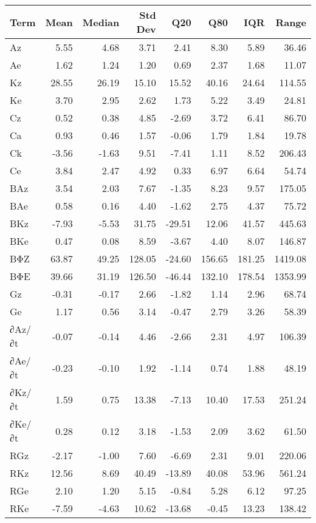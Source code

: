 \begin{tabular}{lrrrrrrr}
\toprule
Term & Mean & Median & Std Dev & Q20 & Q80 & IQR & Range \\
\midrule
Az & 5.55 & 4.68 & 3.71 & 2.41 & 8.30 & 5.89 & 36.46 \\
Ae & 1.62 & 1.24 & 1.20 & 0.69 & 2.37 & 1.68 & 11.07 \\
Kz & 28.55 & 26.19 & 15.10 & 15.52 & 40.16 & 24.64 & 114.55 \\
Ke & 3.70 & 2.95 & 2.62 & 1.73 & 5.22 & 3.49 & 24.81 \\
Cz & 0.52 & 0.38 & 4.85 & -2.69 & 3.72 & 6.41 & 86.70 \\
Ca & 0.93 & 0.46 & 1.57 & -0.06 & 1.79 & 1.84 & 19.78 \\
Ck & -3.56 & -1.63 & 9.51 & -7.41 & 1.11 & 8.52 & 206.43 \\
Ce & 3.84 & 2.47 & 4.92 & 0.33 & 6.97 & 6.64 & 54.74 \\
BAz & 3.54 & 2.03 & 7.67 & -1.35 & 8.23 & 9.57 & 175.05 \\
BAe & 0.58 & 0.16 & 4.40 & -1.62 & 2.75 & 4.37 & 75.72 \\
BKz & -7.93 & -5.53 & 31.75 & -29.51 & 12.06 & 41.57 & 445.63 \\
BKe & 0.47 & 0.08 & 8.59 & -3.67 & 4.40 & 8.07 & 146.87 \\
BΦZ & 63.87 & 49.25 & 128.05 & -24.60 & 156.65 & 181.25 & 1419.08 \\
BΦE & 39.66 & 31.19 & 126.50 & -46.44 & 132.10 & 178.54 & 1353.99 \\
Gz & -0.31 & -0.17 & 2.66 & -1.82 & 1.14 & 2.96 & 68.74 \\
Ge & 1.17 & 0.56 & 3.14 & -0.47 & 2.79 & 3.26 & 58.39 \\
∂Az/∂t & -0.07 & -0.14 & 4.46 & -2.66 & 2.31 & 4.97 & 106.39 \\
∂Ae/∂t & -0.23 & -0.10 & 1.92 & -1.14 & 0.74 & 1.88 & 48.19 \\
∂Kz/∂t & 1.59 & 0.75 & 13.38 & -7.13 & 10.40 & 17.53 & 251.24 \\
∂Ke/∂t & 0.28 & 0.12 & 3.18 & -1.53 & 2.09 & 3.62 & 61.50 \\
RGz & -2.17 & -1.00 & 7.60 & -6.69 & 2.31 & 9.01 & 220.06 \\
RKz & 12.56 & 8.69 & 40.49 & -13.89 & 40.08 & 53.96 & 561.24 \\
RGe & 2.10 & 1.20 & 5.15 & -0.84 & 5.28 & 6.12 & 97.25 \\
RKe & -7.59 & -4.63 & 10.62 & -13.68 & -0.45 & 13.23 & 138.42 \\
\bottomrule
\end{tabular}
